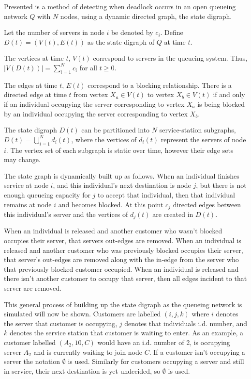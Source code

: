 \documentclass{article}
\begin{document}
Presented is a method of detecting when deadlock occurs in an open queueing network $Q$ with $N$ nodes, using a dynamic directed graph, the state digraph.

Let the number of servers in node $i$ be denoted by $c_i$.
Define $D(t)=(V(t), E(t))$ as the state digraph of $Q$ at time $t$.

The vertices at time \(t\), \(V(t)\) correspond to servers in the
queueing system.
Thus, $\left| V\left(D\left(t\right)\right) \right| = \sum_{i=1}^N c_i$ for all $t \geq 0$.

The edges at time \(t\), \(E(t)\) correspond to a blocking relationship.
There is a directed edge at time \(t\) from vertex \(X_a\in V(t)\) to vertex \(X_b\in
V(t)\) if and only if an individual occupying the server corresponding to vertex
\(X_a\) is being blocked by an individual occupying the server corresponding to
vertex \(X_b\).

The state digraph $D(t)$ can be partitioned into $N$ service-station subgraphs,
$D(t)=\bigcup_{i=1}^N d_i(t)$, where the vertices of $d_i(t)$ represent the servers of node $i$.
The vertex set of each subgraph is static over time, however their edge sets may
change.

The state graph is dynamically built up as follows.
When an individual finishes service at node $i$, and this individual's next destination is node $j$, but there is not enough queueing capacity for $j$ to accept that individual, then that individual remains at node $i$ and becomes blocked.
At this point $c_j$ directed edges between this individual's server and the vertices of $d_j(t)$ are created in $D(t)$.

When an individual is released and another customer who wasn't blocked occupies their server, that servers out-edges are removed.
When an individual is released and another customer who was previously blocked occupies their server, that server's out-edges are removed along with the in-edge from the server who that previously blocked customer occupied.
When an individual is released and there isn't another customer to occupy that server, then all edges incident to that server are removed.

This general process of building up the state digraph as the queueing network is simulated will now be shown.
Customers are labelled $(i, j, k)$ where $i$ denotes the server that customer is occupying, $j$ denotes that individuals i.d. number, and $k$ denotes the service station that customer is waiting to enter.
As an example, a customer labelled $(A_2, 10, C)$ would have an i.d. number of 2, is occupying server $A_2$ and is currently waiting to join node $C$.
If a customer isn't occupying a server the notation $\emptyset$ is used.
Similarly for customers occupying a server and still in service, their next destination is yet undecided, so $\emptyset$ is used.
\end{document}
